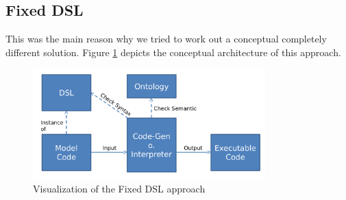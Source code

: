 \subsection{Fixed DSL}
\par
This was the main reason why we tried to work out a conceptual completely different solution. Figure \ref{fig:visualisation_fixed_dsl} depicts the conceptual architecture of this approach.
\begin{figure}[h]
	\centering
	\includegraphics[width=0.8\textwidth]{pics/generation_of_a_dsl/binding2.png}
	\caption{Visualization of the Fixed DSL approach \label{fig:visualisation_fixed_dsl}}	
\end{figure}


